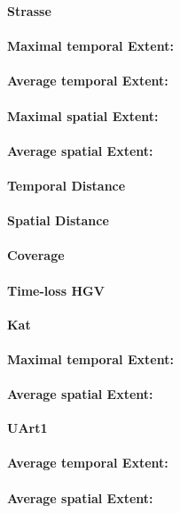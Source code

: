 \large
\centerline{\textbf{Strasse}}
\normalsize

\paragraph{Maximal temporal Extent:}
\paragraph{Average temporal Extent:}
\paragraph{Maximal spatial Extent:}
\paragraph{Average spatial Extent:}
\paragraph{Temporal Distance}
\paragraph{Spatial Distance}
\paragraph{Coverage}
\paragraph{Time-loss HGV}

\large
\centerline{\textbf{Kat}}
\normalsize

\paragraph{Maximal temporal Extent:}
\paragraph{Average spatial Extent:}

\large
\centerline{\textbf{UArt1}}
\normalsize

\paragraph{Average temporal Extent:}
\paragraph{Average spatial Extent:}
